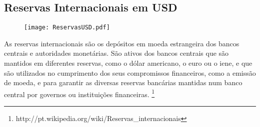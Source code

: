 \documentclass[../../relatorio.tex]{subfiles}
\begin{document}
\subsection{Reservas Internacionais em USD}

\begin{figure}[ht]
  \begin{minipage}{0.30\textheight}
    \centering
      \texttt{[image: ReservasUSD.pdf]}
  \end{minipage}
\end{figure}

As reservas internacionais são os depósitos em moeda estrangeira dos bancos centrais e autoridades monetárias. São ativos dos bancos centrais que são mantidos em diferentes reservas, como o dólar americano, o euro ou o iene, e que são utilizados no cumprimento dos seus compromissos financeiros, como a emissão de moeda, e para garantir as diversas reservas bancárias mantidas num banco central por governos ou instituições financeiras. \footnote{http://pt.wikipedia.org/wiki/Reservas\_internacionais}


\pagebreak
\end{document}

